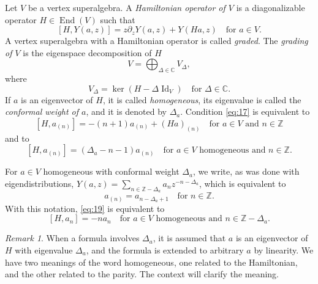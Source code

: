 \documentclass[a4paper, 12pt, reqno]{amsart}
\theoremstyle{remark}
\newtheorem{remark}[theorem]{Remark}
\DeclareMathOperator{\Id}{Id}
\DeclareMathOperator{\End}{End}
\begin{document}
Let $V$ be a vertex superalgebra.
A \emph{Hamiltonian operator of $V$} is a diagonalizable operator $H \in \End(V)$ such that
\begin{equation}
  \label{eq:17}
  [H, Y(a, z)] = z\partial_zY(a, z) + Y(Ha, z) \quad \text{for $a \in V$}.
\end{equation}
A vertex superalgebra with a Hamiltonian operator is called \emph{graded}.
The \emph{grading of $V$} is the eigenspace decomposition of $H$
\begin{equation*}
  V = \bigoplus_{\Delta \in \mathbb{C}}V_{\Delta},
\end{equation*}
where
\begin{equation*}
  V_{\Delta} = \ker(H - \Delta\Id_V) \quad \text{for $\Delta \in \mathbb{C}$}.
\end{equation*}
If $a$ is an eigenvector of $H$, it is called \emph{homogeneous}, its eigenvalue is called the \emph{conformal weight of $a$}, and it is denoted by $\Delta_a$.
Condition \eqref{eq:17} is equivalent to
\begin{equation}
  \label{eq:18}
  [H, a_{(n)}] = -(n + 1)a_{(n)} + (Ha)_{(n)} \quad \text{for $a \in V$ and $n \in \mathbb{Z}$}
\end{equation}
and to
\begin{equation}
  \label{eq:19}
  [H, a_{(n)}] = (\Delta_a - n - 1)a_{(n)} \quad \text{for $a \in V$ homogeneous and $n \in \mathbb{Z}$}.
\end{equation}

For $a \in V$ homogeneous with conformal weight $\Delta_a$, we write, as was done with eigendistributions, $Y(a, z) = \sum_{n \in \mathbb{Z} - \Delta_a}a_nz^{-n - \Delta_a}$, which is equivalent to
\begin{equation}
  \label{eq:20}
  a_{(n)} = a_{n - \Delta_a + 1} \quad \text{for $n \in \mathbb{Z}$}.
\end{equation}
With this notation, \eqref{eq:19} is equivalent to
\begin{equation}
  \label{eq:21}
  [H, a_n] = -na_n \quad \text{for $a \in V$ homogeneous and $n \in \mathbb{Z} - \Delta_a$}.
\end{equation}

\begin{remark}
  \label{rmk:17}
  When a formula involves $\Delta_a$, it is assumed that $a$ is an eigenvector of $H$ with eigenvalue $\Delta_a$, and the formula is extended to arbitrary $a$ by linearity.
  We have two meanings of the word homogeneous, one related to the Hamiltonian, and the other related to the parity.
  The context will clarify the meaning.
\end{remark}
\end{document}

